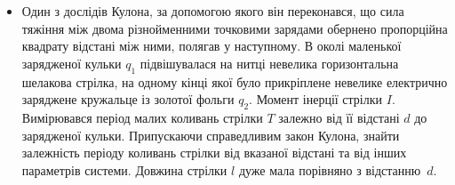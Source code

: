 \begin{itemize}
\item Один з дослідів Кулона, за допомогою якого він переконався, що сила тяжіння між двома різнойменними
точковими зарядами обернено пропорційна квадрату відстані між ними, полягав у наступному. В околі маленької зарядженої кульки $q_1$ підвішувалася на нитці невелика горизонтальна шелакова стрілка, на одному кінці якої було прикріплене невелике електрично заряджене кружальце із золотої фольги $q_2$. Момент інерції стрілки $I$. Вимірювався період малих коливань стрілки $T$ залежно від її відстані $d$ до зарядженої кульки. Припускаючи справедливим закон Кулона, знайти залежність періоду коливань стрілки від вказаної відстані та від інших параметрів системи. Довжина стрілки $l$ дуже мала порівняно з відстанню~$d$.
\end{itemize}